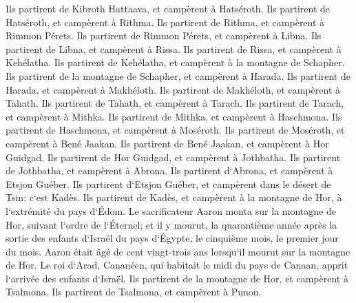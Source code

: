 \verse Ils partirent de Kibroth Hattaava, et campèrent à Hatséroth. 
\verse Ils partirent de Hatséroth, et campèrent à Rithma. 
\verse Ils partirent de Rithma, et campèrent à Rimmon Pérets. 
\verse Ils partirent de Rimmon Pérets, et campèrent à Libna. 
\verse Ils partirent de Libna, et campèrent à Rissa. 
\verse Ils partirent de Rissa, et campèrent à Kehélatha. 
\verse Ils partirent de Kehélatha, et campèrent à la montagne de Schapher. 
\verse Ils partirent de la montagne de Schapher, et campèrent à Harada. 
\verse Ils partirent de Harada, et campèrent à Makhéloth. 
\verse Ils partirent de Makhéloth, et campèrent à Tahath. 
\verse Ils partirent de Tahath, et campèrent à Tarach. 
\verse Ils partirent de Tarach, et campèrent à Mithka. 
\verse Ils partirent de Mithka, et campèrent à Haschmona. 
\verse Ils partirent de Haschmona, et campèrent à Moséroth. 
\verse Ils partirent de Moséroth, et campèrent à Bené Jaakan. 
\verse Ils partirent de Bené Jaakan, et campèrent à Hor Guidgad. 
\verse Ils partirent de Hor Guidgad, et campèrent à Jothbatha. 
\verse Ils partirent de Jothbatha, et campèrent à Abrona. 
\verse Ils partirent d`Abrona, et campèrent à Etsjon Guéber. 
\verse Ils partirent d`Etsjon Guéber, et campèrent dans le désert de Tsin: c`est Kadès. 
\verse Ils partirent de Kadès, et campèrent à la montagne de Hor, à l`extrémité du pays d`Édom. 
\verse Le sacrificateur Aaron monta sur la montagne de Hor, suivant l`ordre de l`Éternel; et il y mourut, la quarantième année après la sortie des enfants d`Israël du pays d`Égypte, le cinquième mois, le premier jour du mois. 
\verse Aaron était âgé de cent vingt-trois ans lorsqu`il mourut sur la montagne de Hor. 
\verse Le roi d`Arad, Cananéen, qui habitait le midi du pays de Canaan, apprit l`arrivée des enfants d`Israël. 
\verse Ils partirent de la montagne de Hor, et campèrent à Tsalmona. 
\verse Ils partirent de Tsalmona, et campèrent à Punon. 
